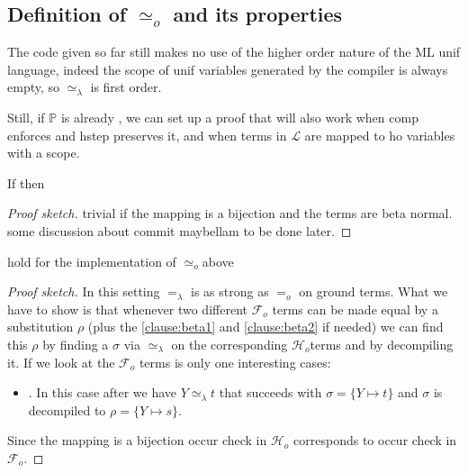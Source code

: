 \documentclass[sigconf,natbib=false,review]{acmart}
\newcommand{\EqualRel}{\ensuremath{=}}
\newcommand{\UnifRel}{\ensuremath{\simeq}}
\newcommand{\Uo}{\texorpdfstring{\ensuremath{\UnifRel_o}\xspace}{unif\_o}}
\newcommand{\Eo}{\ensuremath{\EqualRel_o}\xspace}
\newcommand{\Ue}{\ensuremath{\UnifRel_\lambda}\xspace}
\newcommand{\Ee}{\ensuremath{\EqualRel_\lambda}\xspace}
\newcommand{\llambda}{\ensuremath{\mathcal{L}}\xspace}
\newcommand{\Fo}{\texorpdfstring{\ensuremath{\mathcal{F}_{\!o}\xspace}}{Fo}} %
\newcommand{\Ho}{\texorpdfstring{\ensuremath{\mathcal{H}_o}\xspace}{Ho}}
\newcommand{\foUnifPb}{\ensuremath{\mathbb{P}}\xspace}
\begin{document}
% 



\subsection{Definition of \Uo{} and its properties}\label{sec:founif}



The code given so far still makes no use
of the higher order nature of the ML unif language,
indeed the scope of unif variables generated by the
compiler is always empty, so \Ue{} is first order.

Still, if \foUnifPb is already \wellb, we can set up a proof
that will also work when comp enforces \wellb and  hstep
preserves it, and when terms in \llambda are mapped to ho variables
with a scope.


\begin{lemma} If
   then 
\end{lemma}
\begin{proof}[Proof sketch]
trivial if the mapping is a bijection and 
the terms are beta normal.
some discussion about commit maybellam to be done later.
\end{proof}


\begin{lemma}
 hold for the implementation of \Uo above
\end{lemma}
\begin{proof}[Proof sketch]
 In this setting \Ee is as strong as
\Eo on ground terms. What we have to show is that whenever two different \Fo{}
terms can be made equal by a substitution $\rho$ (plus the \ref{clause:beta1}
and \ref{clause:beta2} if needed) we can find this $\rho$ by finding
a $\sigma$ via \Ue{} on the corresponding \Ho terms and by decompiling it.
If we look at the \Fo{} terms is only one interesting cases:
\begin{itemize}
\item \elpiIn{fuva X ~\Uo~s}. In this case after  we have
  $Y \Ue t$ that succeeds with $\sigma = \{ Y \mapsto t\}$ and
  $\sigma$ is decompiled to $\rho = \{ Y \mapsto s\}$.
\end{itemize}
Since the mapping is a bijection occur check in \Ho{} corresponds to occur
check in \Fo{}.
\end{proof}
\end{document}
